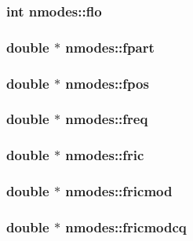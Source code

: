 \subsubsection{\setlength{\rightskip}{0pt plus 5cm}int {\bf nmodes::flo}}\label{structnmodes_53777aeee21554e1a7752f4935700874}


\subsubsection{\setlength{\rightskip}{0pt plus 5cm}double $\ast$ {\bf nmodes::fpart}}\label{structnmodes_507644d8d7d3e345cc298038b0816d10}


\subsubsection{\setlength{\rightskip}{0pt plus 5cm}double $\ast$ {\bf nmodes::fpos}}\label{structnmodes_9d457e1bf445685c63bd8d3a4ed965e2}


\subsubsection{\setlength{\rightskip}{0pt plus 5cm}double $\ast$ {\bf nmodes::freq}}\label{structnmodes_be795ec0b911d0379bb88cae90d5b5cb}


\subsubsection{\setlength{\rightskip}{0pt plus 5cm}double $\ast$ {\bf nmodes::fric}}\label{structnmodes_26ad7a8fab338616b3f7f1940759a689}


\subsubsection{\setlength{\rightskip}{0pt plus 5cm}double $\ast$ {\bf nmodes::fricmod}}\label{structnmodes_2d77b00951c13922d089f8af14641f49}


\subsubsection{\setlength{\rightskip}{0pt plus 5cm}double $\ast$ {\bf nmodes::fricmodcq}}\label{structnmodes_86bfbd2f97e90475c342e6ae65fdc279}


